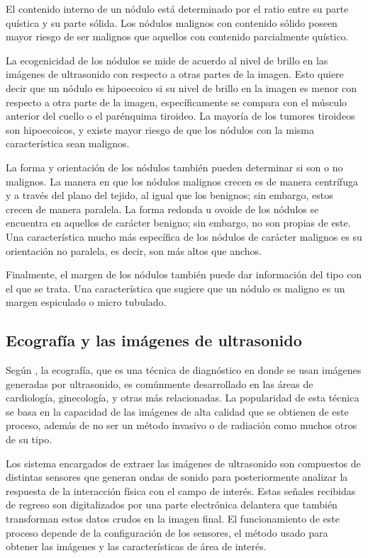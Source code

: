 El contenido interno de un nódulo está determinado por el ratio entre su parte quística y su parte sólida. Los nódulos malignos con contenido sólido poseen mayor riesgo de ser malignos que aquellos con contenido parcialmente quístico.

La ecogenicidad de los nódulos se mide de acuerdo al nivel de brillo en las imágenes de ultrasonido con respecto a otras partes de la imagen. Esto quiere decir que un nódulo es hipoecoico si su nivel de brillo en la imagen es menor con respecto a otra parte de la imagen, específicamente se compara con el músculo anterior del cuello o el parénquima tiroideo. La mayoría de los tumores tiroideos son hipoecoicos, y existe mayor riesgo de que los nódulos con la misma característica sean malignos.

La forma y orientación de los nódulos también pueden determinar si son o no malignos. La manera en que los nódulos malignos crecen es de manera centrífuga y a través del plano del tejido, al igual que los benignos; sin embargo, estos crecen de manera paralela. La forma redonda u ovoide de los nódulos se encuentra en aquellos de carácter benigno; sin embargo, no son propias de este. Una característica mucho más específica de los nódulos de carácter malignos es su orientación no paralela, es decir, son más altos que anchos.

Finalmente, el margen de los nódulos también puede dar información del tipo con el que se trata. Una característica que sugiere que un nódulo es maligno es un margen espiculado o micro tubulado.

\subsection{Ecografía y las imágenes de ultrasonido}
Según \cite{pr_herrera2017diseimp}, la ecografía, que es una técnica de diagnóstico en donde se usan imágenes generadas por ultrasonido, es comúnmente desarrollado en las áreas de cardiología, ginecología, y otras más relacionadas. La popularidad de esta técnica se basa en la capacidad de las imágenes de alta calidad que se obtienen de este proceso, además de no ser un método invasivo o de radiación como muchos otros de su tipo.

Los sistema encargados de extraer las imágenes de ultrasonido son compuestos de distintas sensores que generan ondas de sonido para posteriormente analizar la respuesta de la interacción física con el campo de interés. Estas señales recibidas de regreso son digitalizados por una parte electrónica delantera que también transforman estos datos crudos en la imagen final. El funcionamiento de este proceso depende de la configuración de los sensores, el método usado para obtener las imágenes y las características de área de interés. \parencite{pr_camacho2022ultrasonicimg}

